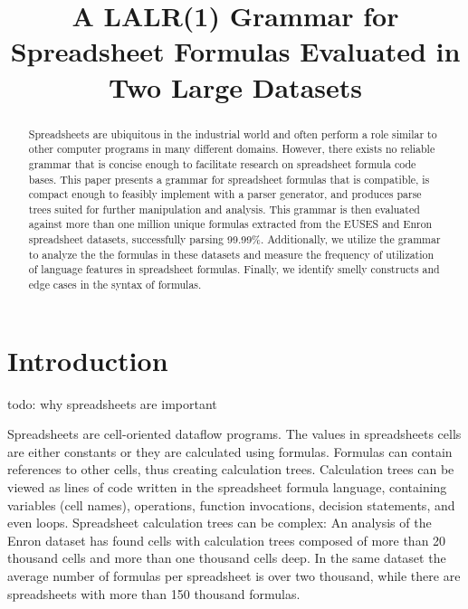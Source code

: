 \documentclass[conference]{IEEEtran}
\begin{document}
\title{A LALR(1) Grammar for Spreadsheet Formulas Evaluated in Two Large Datasets}

\author{
}
\maketitle

\begin{abstract}
Spreadsheets are ubiquitous in the industrial world and often perform a role similar to other computer programs in many different domains.
However, there exists no reliable grammar that is concise enough to facilitate research on spreadsheet formula code bases.
This paper presents a grammar for spreadsheet formulas that is compatible, is compact enough to feasibly implement with a parser generator, and produces parse trees suited for further manipulation and analysis. 
This grammar is then evaluated against more than one million unique formulas extracted from the EUSES and Enron spreadsheet datasets, successfully parsing 99.99\%.
Additionally, we utilize the grammar to analyze the the formulas in these datasets and measure the frequency of utilization of language features in spreadsheet formulas.
Finally, we identify smelly constructs and edge cases in the syntax of formulas.
\end{abstract}

\IEEEpeerreviewmaketitle


\section{Introduction}
todo: why spreadsheets are important

Spreadsheets are cell-oriented dataflow programs. The values in spreadsheets cells are either constants or they are calculated using formulas. Formulas can contain references to other cells, thus creating calculation trees. Calculation trees can be viewed as lines of code written in the spreadsheet formula language, containing variables (cell names), operations, function invocations, decision statements, and even loops. Spreadsheet calculation trees can be complex: An analysis of the Enron dataset \cite{EnronVSEuses} has found cells with calculation trees composed of more than 20 thousand cells and more than one thousand cells deep. In the same dataset the average number of formulas per spreadsheet is over two thousand, while there are spreadsheets with more than 150 thousand formulas.
\end{document}
